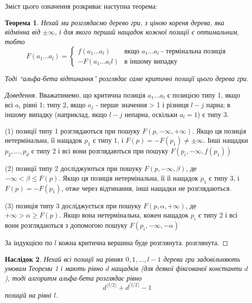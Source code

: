 \documentclass[12pt,a4paper]{article}
\begin{document}
Зміст цього означення розкриває наступна теорема:
\newtheorem{thm}{Теорема}
\newtheorem{cor}[thm]{Наслідок}
\begin{thm}
  Нехай ми розглядаємо дерево гри, з ціною кореня дерева, яка відмінна від
  $\pm\infty$, і для якого перший нащадок кожної позиції є оптимальним, тобто
\begin{equation}
  \label{eq:12}
  F(a_1\dots a_l) =
  \begin{cases}
    f(a_1\dots a_l) & \textit{якщо $a_1\dots a_l$ - термінальна позиція}\\
    -F(a_1\dots a_ll) & \textit{в іншому випадку}
  \end{cases}
\end{equation}

Тоді ``альфа-бета відтинання'' розглядає саме критичні позиції цього дерева гри.
\end{thm}
\begin{proof}[Доведення]
Вважатимемо, що критична позиція $a_1\dots a_l$ є позицією типу 1, якщо всі
$a_i$ рівні 1; типу 2, якщо $a_j$ - перше значення > 1 і різниця $l - j$
парна; в іншому випадку (наприклад, якщо $l - j$ непарна, оскільки $a_l=1$) є
типу 3.

(1) позиції типу 1 розглядаються при пошуку $F(p, -\infty, +\infty)$. Якщо ця
позиція нетермінальна, її нащадок $p_1$ є типу 1, і
$F(p)=-F(p_1)\neq\pm\infty$. Інші нащадки $p_2,\dots,p_d$ є типу 2 і всі вони
розглядаються при пошуку $F(p_i, -\infty, f(p_1))$

(2) позиції типу 2 досліджуються при пошуку $F(p, -\infty, \beta)$, де $-\infty
< \beta \le F(p)$. Якщо ця позиція нетермінальна, її її нащадок $p_1$ є типу 3, і
$F(p)=-F(p_1)$, отже через відтинання, інші нащадки не розглядаються.

(3) позиція типу 3 досліджується при пошуку $F(p, \alpha, +\infty)$, де $+\infty
> \alpha \ge F(p)$. Якщо вона нетермінальна, кожен нащадок $p_i$ є типу 2 і
всі вони розглядаються з допомогою пошуку $F(p_i, -\infty, -\alpha)$

За індукцією по $l$ кожна критична вершина буде розглянута.
розглянута.
\end{proof}

\begin{cor}
  Нехай всі позиції на рівнях $0,1,\dots,l-1$ дерева гри задовільняють умовам
  Теореми 1 і мають рівно $d$ нащадків (для деякої фіксованої константи $d$),
  тоді алгоритм альфа-бета розглядає рівно
  \begin{equation}
    \label{eq:13}
     d^{\lfloor l/2 \rfloor} + d^{\lceil l/2 \rceil} - 1
  \end{equation}
  позицій на рівні $l$.
\end{cor}
\end{document}

